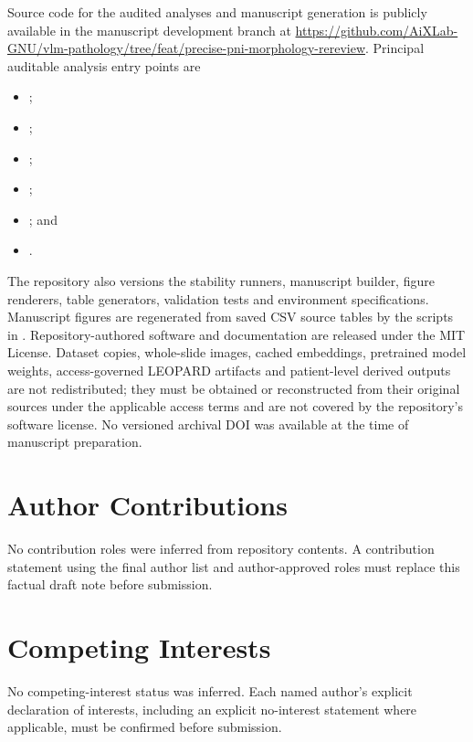 Source code for the audited analyses and manuscript generation is publicly available in
the manuscript development branch at
\url{https://github.com/AiXLab-GNU/vlm-pathology/tree/feat/precise-pni-morphology-rereview}.
Principal auditable analysis entry points are
\begin{itemize}
\item {};
\item {};
\item {};
\item {};
\item {}; and
\item {}.
\end{itemize}
The repository also versions the stability runners, manuscript builder, figure renderers,
table generators, validation tests and environment specifications. Manuscript figures are
regenerated from saved CSV source tables by the scripts in .
Repository-authored software and documentation are released under the MIT License.
Dataset copies, whole-slide images, cached embeddings, pretrained model weights,
access-governed LEOPARD artifacts and patient-level derived outputs are not redistributed;
they must be obtained or reconstructed from their original sources under the applicable
access terms and are not covered by the repository's software license. No versioned archival
DOI was available at the time of manuscript preparation.

\section*{Author Contributions}

No contribution roles were inferred from repository contents. A contribution statement
using the final author list and author-approved roles must replace this factual draft note
before submission.

\section*{Competing Interests}

No competing-interest status was inferred. Each named author's explicit declaration of
interests, including an explicit no-interest statement where applicable, must be confirmed
before submission.

